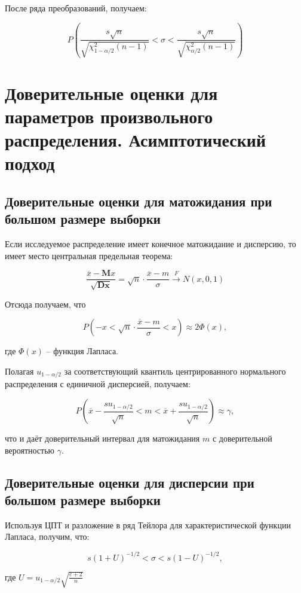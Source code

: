 После ряда преобразований, получаем:

\begin{equation}
	\displaystyle P \left( \frac{s \sqrt{n}} {\sqrt{\chi_{1 - \alpha/2}^2(n-1)}} < \sigma <  \frac{s \sqrt{n}} {\sqrt{\chi_{\alpha/2}^2(n-1)}} \right)
\end{equation}

\section{Доверительные оценки для параметров произвольного распределения. Асимптотический подход}

\subsection{Доверительные оценки для матожидания при большом размере выборки}

Если исследуемое распределение имеет конечное матожидание и дисперсию, то имеет место центральная предельная теорема:

\begin{equation}
\frac{\overline{x}-\mathbf{M}x}{\sqrt{\mathbf{Dx}}}=\sqrt{n} \cdot \frac{\overline{x} - m}{\sigma} \overset{F}{\longrightarrow} N(x, 0, 1)
\end{equation}

Отсюда получаем, что

\begin{equation*}
P \left(-x < \sqrt{n} \cdot \frac{\overline{x} - m}{\sigma} < x \right) \approx 2 \Phi(x),
\end{equation*}

где $\Phi(x)$ -- функция Лапласа.

Полагая $u_{1 - \alpha / 2}$ за соответствующий квантиль центрированного нормального распределения с единичной дисперсией, получаем:

\begin{equation}
P \left(\overline{x} - \frac{su_{1 - \alpha / 2}}{\sqrt{n}} < m < \overline{x} + \frac{su_{1 - \alpha / 2}}{\sqrt{n}} \right) \approx \gamma,
\end{equation}

что и даёт доверительный интервал для матожидания $m$ с доверительной вероятностью $\gamma$.

\subsection{Доверительные оценки для дисперсии при большом размере выборки}

Используя ЦПТ и разложение в ряд Тейлора для характеристической функции Лапласа, получим, что:

\begin{equation}
s(1 + U)^{-1/2} < \sigma < s(1 - U)^{-1/2},
\end{equation}

где $U = u_{1 - \alpha / 2} \sqrt{\frac{e + 2}{n}}$